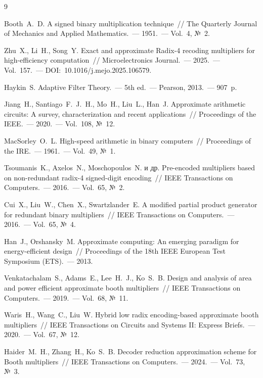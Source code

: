 \documentclass[a4paper, 12pt, oneside]{report}
\begin{document}
\begin{thebibliography}{9}

  Booth~A.~D. A signed binary multiplication technique~//
  The Quarterly Journal of Mechanics and Applied Mathematics.~---
  1951.~--- Vol.~4, №~2.

  Zhu~X., Li~H., Song~Y. Exact and approximate Radix-4 recoding
  multipliers for high-efficiency computation~//
  Microelectronics Journal.~--- 2025.~--- Vol.~157.~---
  DOI:~10.1016/j.mejo.2025.106579.

  Haykin~S. Adaptive Filter Theory.~---
  5th ed.~--- Pearson, 2013.~--- 907~p.

  Jiang~H., Santiago~F.~J.~H., Mo~H., Liu~L., Han~J. Approximate
  arithmetic circuits: A survey, characterization and recent
  applications~// Proceedings of the IEEE.~--- 2020.~--- Vol.~108, №~12.

  MacSorley~O.~L. High-speed arithmetic in binary computers~//
  Proceedings of the IRE.~--- 1961.~--- Vol.~49, №~1.

  Tsoumanis~K., Axelos~N., Moschopoulos~N. и др. Pre-encoded
  multipliers based on non-redundant radix-4 signed-digit encoding~//
  IEEE Transactions on Computers.~--- 2016.~--- Vol.~65, №~2.

  Cui~X., Liu~W., Chen~X., Swartzlander~E. A modified partial
  product generator for redundant binary multipliers~//
  IEEE Transactions on Computers.~--- 2016.~--- Vol.~65, №~4.

  Han~J., Orshansky~M. Approximate computing: An emerging paradigm
  for energy-efficient design~// Proceedings of the 18th IEEE
  European Test Symposium (ETS).~--- 2013.

  Venkatachalam~S., Adams~E., Lee~H.~J., Ko~S.~B. Design and analysis
  of area and power efficient approximate booth multipliers~//
  IEEE Transactions on Computers.~--- 2019.~--- Vol.~68, №~11.

  Waris~H., Wang~C., Liu~W. Hybrid low radix encoding-based
  approximate booth multipliers~// IEEE Transactions on Circuits and
  Systems II: Express Briefs.~--- 2020.~--- Vol.~67, №~12.

  Haider~M.~H., Zhang~H., Ko~S.~B. Decoder reduction approximation
  scheme for Booth multipliers~// IEEE Transactions on Computers.~---
  2024.~--- Vol.~73, №~3.


\end{thebibliography}
\end{document}
